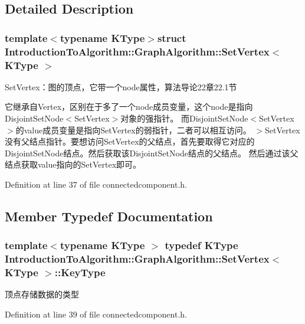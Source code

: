 \subsection{Detailed Description}
\subsubsection*{template$<$typename K\+Type$>$struct Introduction\+To\+Algorithm\+::\+Graph\+Algorithm\+::\+Set\+Vertex$<$ K\+Type $>$}

Set\+Vertex：图的顶点，它带一个node属性，算法导论22章22.1节 

它继承自\+Vertex，区别在于多了一个node成员变量，这个node是指向\+Disjoint\+Set\+Node$<$\+Set\+Vertex$>$对象的强指针。 而\+Disjoint\+Set\+Node$<$\+Set\+Vertex$>$的value成员变量是指向\+Set\+Vertex的弱指针，二者可以相互访问。 $>$Set\+Vertex没有父结点指针。要想访问\+Set\+Vertex的父结点，首先要取得它对应的\+Disjoint\+Set\+Node结点。然后获取该\+Disjoint\+Set\+Node结点的父结点。 然后通过该父结点获取value指向的\+Set\+Vertex即可。 

Definition at line 37 of file connectedcomponent.\+h.



\subsection{Member Typedef Documentation}
\hypertarget{struct_introduction_to_algorithm_1_1_graph_algorithm_1_1_set_vertex_a0cfdcd9af991198be63495f7fb60965d}{}
\subsubsection[{Key\+Type}]{\setlength{\rightskip}{0pt plus 5cm}template$<$typename K\+Type $>$ typedef K\+Type {\bf Introduction\+To\+Algorithm\+::\+Graph\+Algorithm\+::\+Set\+Vertex}$<$ K\+Type $>$\+::{\bf Key\+Type}}\label{struct_introduction_to_algorithm_1_1_graph_algorithm_1_1_set_vertex_a0cfdcd9af991198be63495f7fb60965d}
顶点存储数据的类型 

Definition at line 39 of file connectedcomponent.\+h.

\hypertarget{struct_introduction_to_algorithm_1_1_graph_algorithm_1_1_set_vertex_ae69791a589d95b0f4f378e08b75b041c}{}
